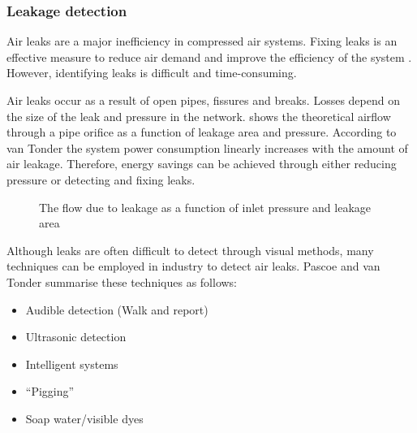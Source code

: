 		 \subsubsection{Leakage detection}	 
		 Air leaks are a major inefficiency in compressed air systems. Fixing leaks is an effective measure to reduce air demand and improve the efficiency of the system \cite{van2011sustaining}. However, identifying leaks is difficult and time-consuming.
		 \par 
		  Air leaks occur as a result of open pipes, fissures and breaks. Losses depend on the size of the leak and pressure in the network.  shows the theoretical airflow through a pipe orifice as a function of leakage area and pressure\footnotemark[1]. According to van Tonder \cite{van2011sustaining} the system power consumption linearly increases with the amount of air leakage. Therefore, energy savings can be achieved through either reducing pressure or detecting and fixing leaks.
		 \begin{figure}[!htbp]
		 	\centering
		 	\fbox{\hspace{1.5cm}\hspace{1.5cm}}
		 	\caption[The flow due to leakage as a function of inlet pressure and leakage area]{ The flow due to leakage as a function of inlet pressure and leakage area\protect\footnotemark[1]}
		 	\label{fig: Leak losses}
		 \end{figure}
	 \par 
		 Although leaks are often difficult to detect through visual methods, many techniques can be employed in industry to detect air leaks. Pascoe \cite{Pascoe2016Masters} and van Tonder \cite{vanTonder2010Masters} summarise these techniques as follows:
		 \begin{itemize}
		 	\item Audible detection (Walk and report)
		 	\item Ultrasonic detection
		 	\item Intelligent systems\footnotemark[2]
		 	\item \enquote{Pigging}\footnotemark[3]
		 	\item Soap water/visible dyes 
		 \end{itemize}
